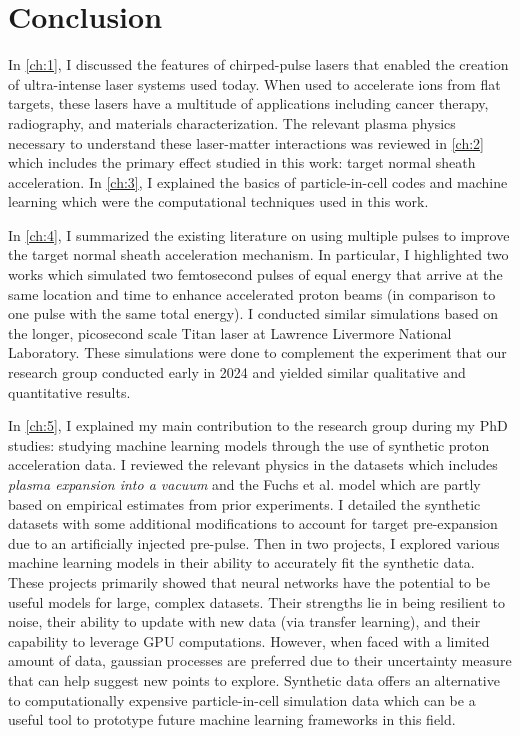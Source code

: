\chapter{Conclusion} \label{ch:7}

In \autoref{ch:1}, I discussed the features of chirped-pulse lasers that enabled the creation of ultra-intense laser systems used today. When used to accelerate ions from flat targets, these lasers have a multitude of applications including cancer therapy, radiography, and materials characterization. The relevant plasma physics necessary to understand these laser-matter interactions was reviewed in \autoref{ch:2} which includes the primary effect studied in this work: target normal sheath acceleration. In \autoref{ch:3}, I explained the basics of particle-in-cell codes and machine learning which were the computational techniques used in this work. 

In \autoref{ch:4}, I summarized the existing literature on using multiple pulses to improve the target normal sheath acceleration mechanism. In particular, I highlighted two works \cite{Rahman_2021_PoP, Ferri_2019_Nat_Comm} which simulated two femtosecond pulses of equal energy that arrive at the same location and time to enhance accelerated proton beams (in comparison to one pulse with the same total energy). I conducted similar simulations based on the longer, picosecond scale Titan laser at Lawrence Livermore National Laboratory. These simulations were done to complement the experiment that our research group conducted early in 2024 and yielded similar qualitative and quantitative results.

In \autoref{ch:5}, I explained my main contribution to the research group during my PhD studies: studying machine learning models through the use of synthetic proton acceleration data. I reviewed the relevant physics in the datasets which includes \emph{plasma expansion into a vacuum} \cite{Mora_2003_PRL} and the Fuchs et al. model \cite{Fuchs_2005_Nat} which are partly based on empirical estimates from prior experiments. I detailed the synthetic datasets with some additional modifications to account for target pre-expansion due to an artificially injected pre-pulse. Then in two projects, I explored various machine learning models in their ability to accurately fit the synthetic data. These projects primarily showed that neural networks have the potential to be useful models for large, complex datasets. Their strengths lie in being resilient to noise, their ability to update with new data (via transfer learning), and their capability to leverage GPU computations. However, when faced with a limited amount of data, gaussian processes are preferred due to their uncertainty measure that can help suggest new points to explore. Synthetic data offers an alternative to computationally expensive particle-in-cell simulation data which can be a useful tool to prototype future machine learning frameworks in this field.

